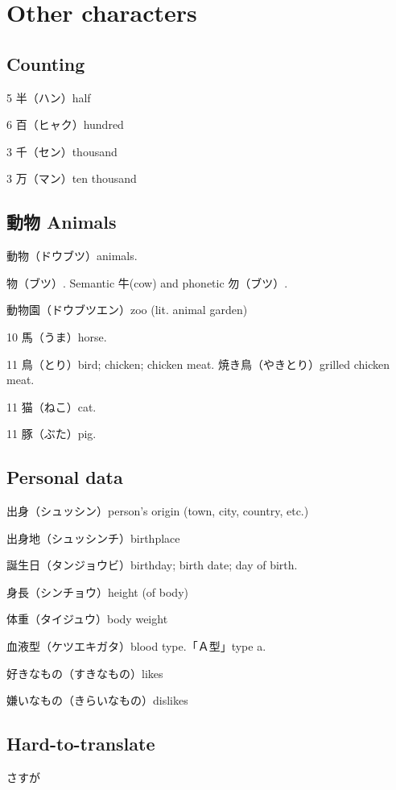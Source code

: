 \chapter{Other characters}

\section{Counting}

5 半（ハン）half

6 百（ヒャク）hundred

3 千（セン）thousand

3 万（マン）ten thousand

\section{動物 Animals}

動物（ドウブツ）animals.

物（ブツ）.
Semantic 牛(cow) and phonetic 勿（ブツ）.

動物園（ドウブツエン）zoo (lit. animal garden)

10 馬（うま）horse.

11 鳥（とり）bird; chicken; chicken meat.
焼き鳥（やきとり）grilled chicken meat.

11 猫（ねこ）cat.

11 豚（ぶた）pig.

\section{Personal data}

出身（シュッシン）person's origin (town, city, country, etc.)

出身地（シュッシンチ）birthplace

誕生日（タンジョウビ）birthday; birth date; day of birth.

身長（シンチョウ）height (of body)

体重（タイジュウ）body weight

血液型（ケツエキガタ）blood type.「Ａ型」type a.

好きなもの（すきなもの）likes

嫌いなもの（きらいなもの）dislikes

\section{Hard-to-translate}

さすが

